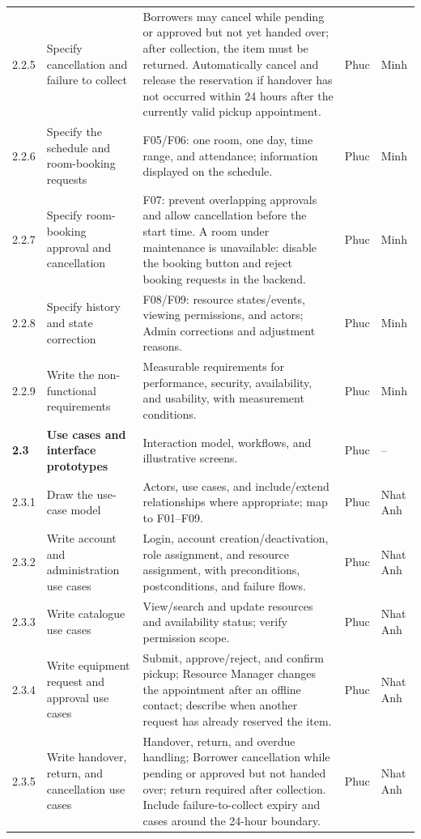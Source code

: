 \documentclass[11pt]{article}
\begin{document}
\begin{longtable}{@{}L{1.15cm}L{3.2cm}L{7.6cm}L{1.4cm}L{1.4cm}@{}}
2.2.5 & Specify cancellation and failure to collect & Borrowers may cancel while pending or approved but not yet handed over; after collection, the item must be returned. Automatically cancel and release the reservation if handover has not occurred within 24 hours after the currently valid pickup appointment. & Phuc & Minh \\
2.2.6 & Specify the schedule and room-booking requests & F05/F06: one room, one day, time range, and attendance; information displayed on the schedule. & Phuc & Minh \\
2.2.7 & Specify room-booking approval and cancellation & F07: prevent overlapping approvals and allow cancellation before the start time. A room under maintenance is unavailable: disable the booking button and reject booking requests in the backend. & Phuc & Minh \\
2.2.8 & Specify history and state correction & F08/F09: resource states/events, viewing permissions, and actors; Admin corrections and adjustment reasons. & Phuc & Minh \\
2.2.9 & Write the non-functional requirements & Measurable requirements for performance, security, availability, and usability, with measurement conditions. & Phuc & Minh \\
\textbf{2.3} & \textbf{Use cases and interface prototypes} & Interaction model, workflows, and illustrative screens. & Phuc & -- \\
2.3.1 & Draw the use-case model & Actors, use cases, and include/extend relationships where appropriate; map to F01--F09. & Phuc & Nhat Anh \\
2.3.2 & Write account and administration use cases & Login, account creation/deactivation, role assignment, and resource assignment, with preconditions, postconditions, and failure flows. & Phuc & Nhat Anh \\
2.3.3 & Write catalogue use cases & View/search and update resources and availability status; verify permission scope. & Phuc & Nhat Anh \\
2.3.4 & Write equipment request and approval use cases & Submit, approve/reject, and confirm pickup; Resource Manager changes the appointment after an offline contact; describe when another request has already reserved the item. & Phuc & Nhat Anh \\
2.3.5 & Write handover, return, and cancellation use cases & Handover, return, and overdue handling; Borrower cancellation while pending or approved but not handed over; return required after collection. Include failure-to-collect expiry and cases around the 24-hour boundary. & Phuc & Nhat Anh \\

\end{longtable}
\end{document}

